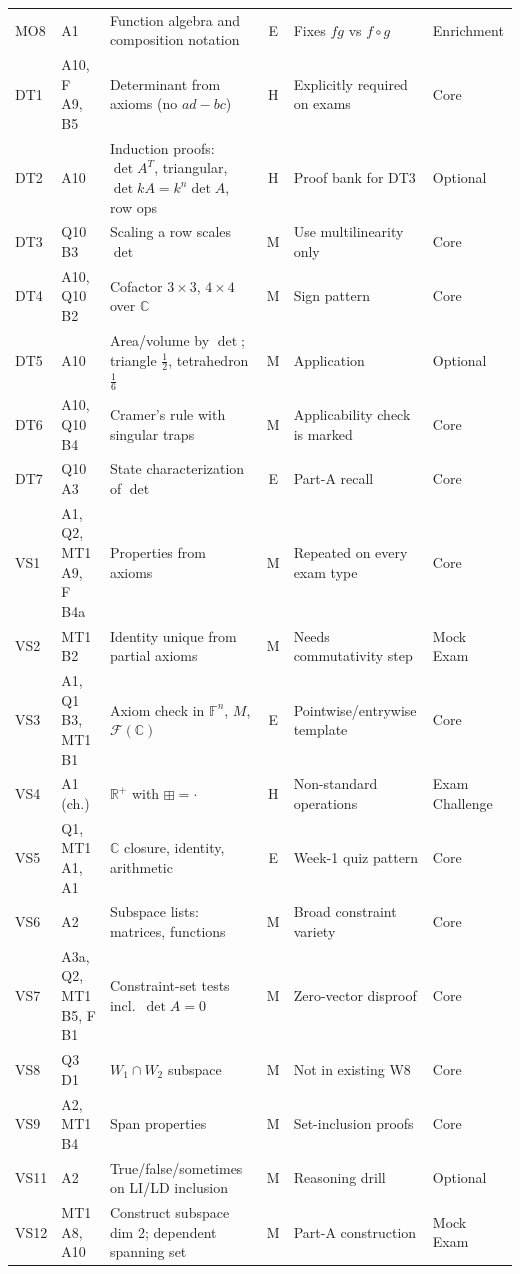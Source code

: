 \documentclass[9pt]{article}
\begin{document}
{\begin{longtable}{@{}l p{2.6cm} p{5.2cm} c p{3.9cm} p{1.7cm}@{}}
MO8 & A1 & Function algebra and composition notation & E & Fixes $fg$ vs $f\circ g$ & Enrichment\\
DT1 & A10, F A9, B5 & Determinant from axioms (no $ad-bc$) & H & Explicitly required on exams & Core\\
DT2 & A10 & Induction proofs: $\det A^T$, triangular, $\det kA=k^n\det A$, row ops & H & Proof bank for DT3 & Optional\\
DT3 & Q10 B3 & Scaling a row scales $\det$ & M & Use multilinearity only & Core\\
DT4 & A10, Q10 B2 & Cofactor $3\times3$, $4\times4$ over $\mathbb C$ & M & Sign pattern & Core\\
DT5 & A10 & Area/volume by $\det$; triangle $\tfrac12$, tetrahedron $\tfrac16$ & M & Application & Optional\\
DT6 & A10, Q10 B4 & Cramer's rule with singular traps & M & Applicability check is marked & Core\\
DT7 & Q10 A3 & State characterization of $\det$ & E & Part-A recall & Core\\
VS1 & A1, Q2, MT1 A9, F B4a & Properties from axioms & M & Repeated on every exam type & Core\\
VS2 & MT1 B2 & Identity unique from partial axioms & M & Needs commutativity step & Mock Exam\\
VS3 & A1, Q1 B3, MT1 B1 & Axiom check in $\mathbb F^n$, $M$, $\mathcal F(\mathbb C)$ & E & Pointwise/entrywise template & Core\\
VS4 & A1 (ch.) & $\mathbb R^+$ with $\boxplus=\cdot$ & H & Non-standard operations & Exam Challenge\\
VS5 & Q1, MT1 A1, A1 & $\mathbb C$ closure, identity, arithmetic & E & Week-1 quiz pattern & Core\\
VS6 & A2 & Subspace lists: matrices, functions & M & Broad constraint variety & Core\\
VS7 & A3a, Q2, MT1 B5, F B1 & Constraint-set tests incl.\ $\det A=0$ & M & Zero-vector disproof & Core\\
VS8 & Q3 D1 & $W_1\cap W_2$ subspace & M & Not in existing W8 & Core\\
VS9 & A2, MT1 B4 & Span properties & M & Set-inclusion proofs & Core\\
VS11 & A2 & True/false/sometimes on LI/LD inclusion & M & Reasoning drill & Optional\\
VS12 & MT1 A8, A10 & Construct subspace dim 2; dependent spanning set & M & Part-A construction & Mock Exam\\

\end{longtable}}
\end{document}
